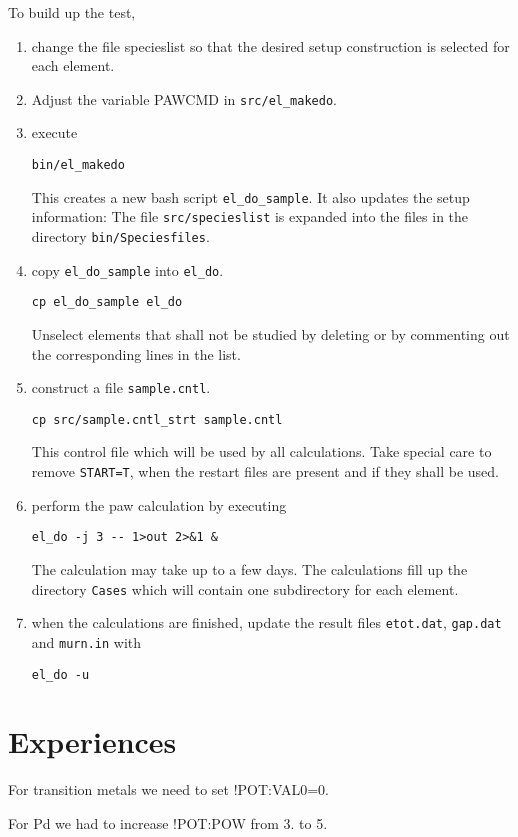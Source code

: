 \documentclass{book}
\begin{document}
To build up the test, 
\begin{enumerate}
\item change the file specieslist so that the desired setup
  construction is selected for each element.
%
\item Adjust the variable PAWCMD in \verb|src/el_makedo|.
%
\item execute
\begin{verbatim}
bin/el_makedo
\end{verbatim}
This creates a new bash script \verb|el_do_sample|. It also updates the
setup information: The file \verb|src/specieslist| is expanded into
the files in the directory \verb|bin/Speciesfiles|.
%
\item copy \verb|el_do_sample| into \verb|el_do|. 
\begin{verbatim}
cp el_do_sample el_do
\end{verbatim}
Unselect elements
  that shall not be studied by deleting or by commenting out the
  corresponding lines in the list.
%
\item construct a file \verb|sample.cntl|.
\begin{verbatim}
cp src/sample.cntl_strt sample.cntl
\end{verbatim}
This control file which will be used by all calculations. Take special
care to remove \verb|START=T|, when the restart files are present and
if they shall be used.
%
\item perform the paw calculation by executing 
\begin{verbatim}
el_do -j 3 -- 1>out 2>&1 &
\end{verbatim}
The calculation may take up to a few days. The calculations fill up
the directory \verb|Cases| which will contain one subdirectory for
each element.
%
\item when the calculations are finished, update the result files \verb|etot.dat|, \verb|gap.dat| and \verb|murn.in| with
\begin{verbatim}
el_do -u
\end{verbatim}

\end{enumerate}

\section*{Experiences}
For transition metals we need to set !POT:VAL0=0. 

For Pd we had to increase  !POT:POW from 3. to 5.
\end{document}
